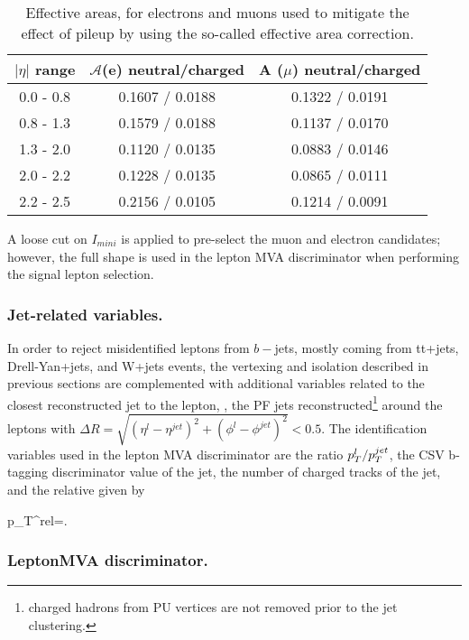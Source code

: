 \begin{table}[!htbp]
\centering
\small
\begin{tabular}{ccc}\hline
$|\eta|$ range & $\mathcal{A}$(e) neutral/charged & A ($\mu$) neutral/charged \\\hline
0.0 - 0.8      & 0.1607 / 0.0188                  & 0.1322 / 0.0191 \\
0.8 - 1.3      & 0.1579 / 0.0188                  & 0.1137 / 0.0170 \\
1.3 - 2.0      & 0.1120 / 0.0135                  & 0.0883 / 0.0146 \\
2.0 - 2.2      & 0.1228 / 0.0135                  & 0.0865 / 0.0111 \\
2.2 - 2.5      & 0.2156 / 0.0105                  & 0.1214 / 0.0091 \\ \hline
\end{tabular}
\caption[Effective areas, for electrons and muons.]{ Effective areas, for electrons and muons used to mitigate the effect of pileup by using the so-called effective area correction.}
\label{tab:pileup_area}
\end{table}

A loose cut on $I_{mini}$ is applied to pre-select the muon and electron candidates; however, the full shape is used in the lepton MVA discriminator when performing the signal lepton selection.

\subsubsection*{Jet-related variables.}

In order to reject misidentified leptons from $b-$jets, mostly coming from tt+jets, Drell-Yan+jets, and W+jets events, the vertexing and isolation described in previous sections are complemented with additional variables related to the closest reconstructed jet to the lepton, \ie, the PF jets reconstructed\footnote{charged hadrons from PU vertices are not removed prior to the jet clustering.} around the leptons with $\Delta R=\sqrt{( \eta^l - \eta^{jet})^2 + (\phi^l - \phi^{jet})^2} < 0.5$. The identification variables used in the lepton MVA discriminator are the ratio $p_T^l/p_T^{jet}$, the CSV b-tagging discriminator value of the jet, the number of charged tracks of the jet, and the relative \pt given by

\beqn
p_T^{rel}=.
\eeqn


\subsubsection*{LeptonMVA discriminator.}\label{sssec:leptonmva}

